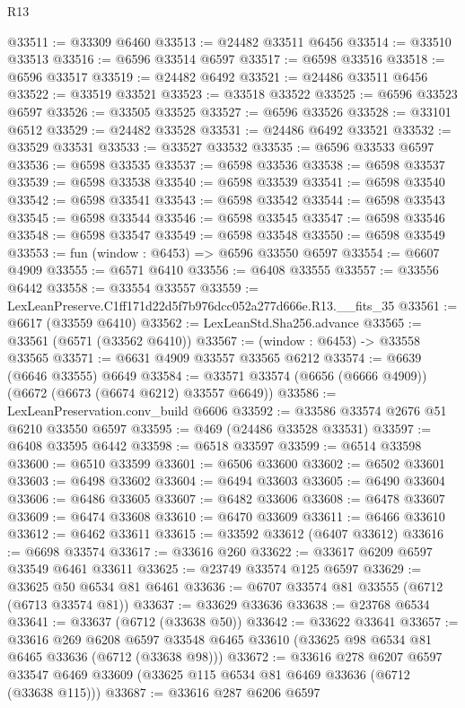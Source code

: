 \begin{lexlean}{R13}
\begin{coremodule}
@33511 := @33309 @6460
@33513 := @24482 @33511 @6456
@33514 := @33510 @33513
@33516 := @6596 @33514 @6597
@33517 := @6598 @33516
@33518 := @6596 @33517
@33519 := @24482 @6492
@33521 := @24486 @33511 @6456
@33522 := @33519 @33521
@33523 := @33518 @33522
@33525 := @6596 @33523 @6597
@33526 := @33505 @33525
@33527 := @6596 @33526
@33528 := @33101 @6512
@33529 := @24482 @33528
@33531 := @24486 @6492 @33521
@33532 := @33529 @33531
@33533 := @33527 @33532
@33535 := @6596 @33533 @6597
@33536 := @6598 @33535
@33537 := @6598 @33536
@33538 := @6598 @33537
@33539 := @6598 @33538
@33540 := @6598 @33539
@33541 := @6598 @33540
@33542 := @6598 @33541
@33543 := @6598 @33542
@33544 := @6598 @33543
@33545 := @6598 @33544
@33546 := @6598 @33545
@33547 := @6598 @33546
@33548 := @6598 @33547
@33549 := @6598 @33548
@33550 := @6598 @33549
@33553 := fun (window : @6453) => @6596 @33550 @6597
@33554 := @6607 @4909
@33555 := @6571 @6410
@33556 := @6408 @33555
@33557 := @33556 @6442
@33558 := @33554 @33557
@33559 := LexLeanPreserve.C1ff171d22d5f7b976dcc052a277d666e.R13.__fits_35
@33561 := @6617 (@33559 @6410)
@33562 := LexLeanStd.Sha256.advance
@33565 := @33561 (@6571 (@33562 @6410))
@33567 := (window : @6453) -> @33558 @33565
@33571 := @6631 @4909 @33557 @33565 @6212
@33574 := @6639 (@6646 @33555) @6649
@33584 := @33571 @33574 (@6656 (@6666 @4909)) (@6672 (@6673 (@6674 @6212) @33557 @6649))
@33586 := LexLeanPreservation.conv_build @6606
@33592 := @33586 @33574 @2676 @51 @6210 @33550 @6597
@33595 := @469 (@24486 @33528 @33531)
@33597 := @6408 @33595 @6442
@33598 := @6518 @33597
@33599 := @6514 @33598
@33600 := @6510 @33599
@33601 := @6506 @33600
@33602 := @6502 @33601
@33603 := @6498 @33602
@33604 := @6494 @33603
@33605 := @6490 @33604
@33606 := @6486 @33605
@33607 := @6482 @33606
@33608 := @6478 @33607
@33609 := @6474 @33608
@33610 := @6470 @33609
@33611 := @6466 @33610
@33612 := @6462 @33611
@33615 := @33592 @33612 (@6407 @33612)
@33616 := @6698 @33574
@33617 := @33616 @260
@33622 := @33617 @6209 @6597 @33549 @6461 @33611
@33625 := @23749 @33574 @125 @6597
@33629 := @33625 @50 @6534 @81 @6461
@33636 := @6707 @33574 @81 @33555 (@6712 (@6713 @33574 @81))
@33637 := @33629 @33636
@33638 := @23768 @6534
@33641 := @33637 (@6712 (@33638 @50))
@33642 := @33622 @33641
@33657 := @33616
    @269
    @6208
    @6597
    @33548
    @6465
    @33610
    (@33625 @98 @6534 @81 @6465 @33636 (@6712 (@33638 @98)))
@33672 := @33616
    @278
    @6207
    @6597
    @33547
    @6469
    @33609
    (@33625 @115 @6534 @81 @6469 @33636 (@6712 (@33638 @115)))
@33687 := @33616
    @287
    @6206
    @6597

\end{coremodule}
\end{lexlean}
